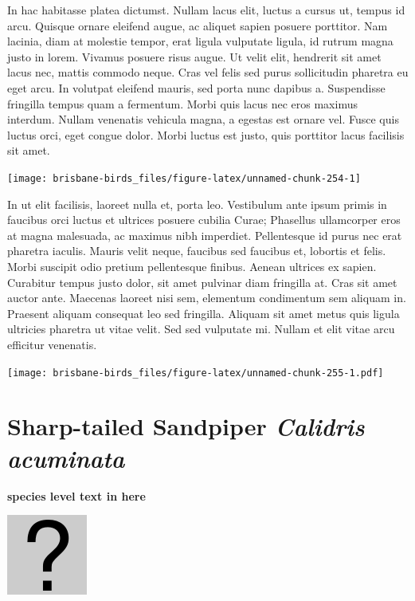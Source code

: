 \documentclass[]{book}
\let\origfigure\figure
\let\endorigfigure\endfigure
\renewenvironment{figure}[1][2] {
  \expandafter\origfigure\expandafter[H]
} {
  \endorigfigure
}
\begin{document}
In hac habitasse platea dictumst. Nullam lacus elit, luctus a cursus ut,
tempus id arcu. Quisque ornare eleifend augue, ac aliquet sapien posuere
porttitor. Nam lacinia, diam at molestie tempor, erat ligula vulputate
ligula, id rutrum magna justo in lorem. Vivamus posuere risus augue. Ut
velit elit, hendrerit sit amet lacus nec, mattis commodo neque. Cras vel
felis sed purus sollicitudin pharetra eu eget arcu. In volutpat eleifend
mauris, sed porta nunc dapibus a. Suspendisse fringilla tempus quam a
fermentum. Morbi quis lacus nec eros maximus interdum. Nullam venenatis
vehicula magna, a egestas est ornare vel. Fusce quis luctus orci, eget
congue dolor. Morbi luctus est justo, quis porttitor lacus facilisis sit
amet.

\begin{figure}
\texttt{[image: brisbane-birds\_files/figure-latex/unnamed-chunk-254-1]} \caption{insert figure caption}\label{fig:unnamed-chunk-254}
\end{figure}

In ut elit facilisis, laoreet nulla et, porta leo. Vestibulum ante ipsum
primis in faucibus orci luctus et ultrices posuere cubilia Curae;
Phasellus ullamcorper eros at magna malesuada, ac maximus nibh
imperdiet. Pellentesque id purus nec erat pharetra iaculis. Mauris velit
neque, faucibus sed faucibus et, lobortis et felis. Morbi suscipit odio
pretium pellentesque finibus. Aenean ultrices ex sapien. Curabitur
tempus justo dolor, sit amet pulvinar diam fringilla at. Cras sit amet
auctor ante. Maecenas laoreet nisi sem, elementum condimentum sem
aliquam in. Praesent aliquam consequat leo sed fringilla. Aliquam sit
amet metus quis ligula ultricies pharetra ut vitae velit. Sed sed
vulputate mi. Nullam et elit vitae arcu efficitur venenatis.

\begin{figure}
\centering
\texttt{[image: brisbane-birds\_files/figure-latex/unnamed-chunk-255-1.pdf]}
\caption{\label{fig:unnamed-chunk-255}insert figure caption}
\end{figure}

\section{\texorpdfstring{Sharp-tailed Sandpiper \emph{Calidris
acuminata}}{Sharp-tailed Sandpiper Calidris acuminata}}\label{sharp-tailed-sandpiper-calidris-acuminata}

\textbf{species level text in here}

\begin{figure}
\centering
\includegraphics{assets/missing.png}
\caption{No image for species}
\end{figure}
\end{document}
